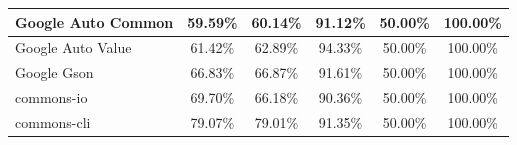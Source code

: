 \documentclass[../../main]{subfiles}
\begin{document}
\begin{table}[!htb]
\begin{tabular}{|l|c|c|c|c|c|}
Google Auto Common            & 59.59\%                                                                                 & 60.14\%                                                                                     & 91.12\%                                                                              & 50.00\%                                                                               & 100.00\%                                                                             \\ \hline
Google Auto Value             & 61.42\%                                                                                 & 62.89\%                                                                                     & 94.33\%                                                                              & 50.00\%                                                                               & 100.00\%                                                                             \\ \hline
Google Gson                   & 66.83\%                                                                                 & 66.87\%                                                                                     & 91.61\%                                                                              & 50.00\%                                                                               & 100.00\%                                                                             \\ \hline
commons-io                    & 69.70\%                                                                                 & 66.18\%                                                                                     & 90.36\%                                                                              & 50.00\%                                                                               & 100.00\%                                                                             \\ \hline
commons-cli                   & 79.07\%                                                                                 & 79.01\%                                                                                     & 91.35\%                                                                              & 50.00\%                                                                               & 100.00\%                                                                             \\ \hline

\end{tabular}
\end{table}
\end{document}
